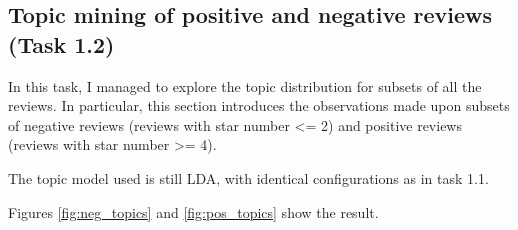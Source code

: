 \documentclass[11pt]{article}
\begin{document}
\subsection{Topic mining of positive and negative reviews (Task 1.2)}
In this task, I managed to explore the topic distribution for subsets of all the reviews.
In particular, this section introduces the observations made upon subsets of negative reviews (reviews with star number <= 2) and positive reviews (reviews with star number >= 4).

The topic model used is still LDA, with identical configurations as in task 1.1.

Figures \ref{fig:neg_topics} and \ref{fig:pos_topics} show the result.
\begin{figure}[htp!]
  \centering

\end{figure}
\end{document}
